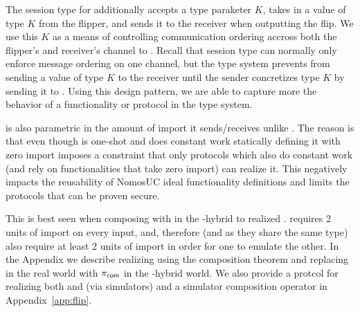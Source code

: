 The session type for \Fflip additionally accepts a type paraketer $K$, takes in a value of type $K$ from the flipper, and sends it to the receiver when outputting the flip.
We use this $K$ as a means of controlling communication ordering accross both the flipper's and receiver's channel to \Fflip.
Recall that session type can normally only enforce message ordering on one channel, but the type system prevents \Fflip from sending a value of type $K$ to the receiver until the sender concretizes type $K$ by sending it to \Fflip.
Using this design pattern, we are able to capture more the behavior of a functionality or protocol in the type system.

\Fflip is also parametric in the amount of import it sends/receives unlike \Fropp. The reason is that even though \Fflip is one-shot and does constant work
statically defining it with zero import imposes a constraint that only protocols which also do constant work (and rely on functionalities that take zero import) 
can realize it. 
This negatively impacts the reusability of NomosUC ideal functionality definitions and limits the protocols that can be proven secure.

This is best seen when composing  with  in the \Fropp-hybrid to realized \Fflip. \Fropp requires 2 units of import on every input, and, therefore  (and \Fflip as they share the same type) also require at least 2 units of import in order for one to emulate the other.
In the Appendix we describe realizing \Fflip using the composition theorem and replacing \Fcom in the real world with $\pi_{{\mathsf {com}}}$ in the \Fropp-hybrid world.
We also provide a protcol for realizing both \Fflip and \Fcom (via simulators) and a simulator composition operator in Appendix~\ref{app:flip}.


